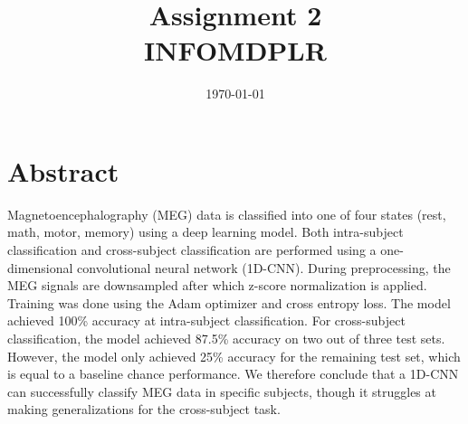 \documentclass[conference]{IEEEtran}
\begin{document}
\title{Assignment 2\\INFOMDPLR}
\author{
	\and
	\and
	\and
}
\date{\today}
\maketitle

\section{Abstract}
Magnetoencephalography (MEG) data is classified into one of four states (rest, math, motor, memory) using a deep learning model.
Both intra-subject classification and cross-subject classification are performed using a one-dimensional convolutional neural network (1D-CNN).
During preprocessing, the MEG signals are downsampled after which z-score normalization is applied.
Training was done using the Adam optimizer and cross entropy loss.
The model achieved 100\% accuracy at intra-subject classification.
For cross-subject classification, the model achieved 87.5\% accuracy on two out of three test sets.
However, the model only achieved 25\% accuracy for the remaining test set, which is equal to a baseline chance performance.
We therefore conclude that a 1D-CNN can successfully classify MEG data in specific subjects, though it struggles at making generalizations for the cross-subject task.
\end{document}
